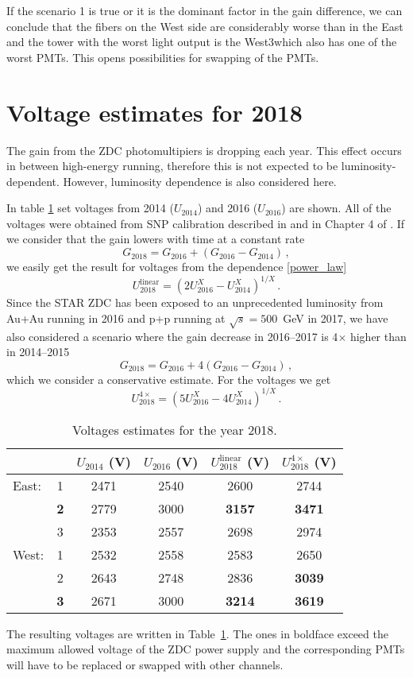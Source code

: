 If the scenario 1 is true or it is the dominant factor in the gain difference, we can conclude that the fibers on the West side are considerably worse than in the East and the tower with the worst light output is the West3\@ which also has one of the worst PMTs. This opens possibilities for swapping of the PMTs.

\section{Voltage estimates for 2018}
The gain from the ZDC photomultipiers is dropping each year. This effect occurs in between high-energy running, therefore this is not expected to be luminosity-dependent. However, luminosity dependence is also considered here.

In table \ref{voltsTable} set voltages from 2014 ($U_{2014}$) and 2016 ($U_{2016}$) are shown. All of the voltages were obtained from SNP calibration described in \cite{calib2014} and in Chapter 4 of \cite{ZDC_ops_manual}\@. If we consider that the gain lowers with time at a constant rate
\begin{equation}
G_{2018} = G_{2016} + (G_{2016} - G_{2014})\,,
\end{equation}
we easily get the result for voltages from the dependence \eqref{power_law}
\begin{equation}
U_{2018}^\text{linear} = (2 U_{2016}^X - U_{2014}^X)^{1/X}\,.
\end{equation}
Since the STAR ZDC has been exposed to an unprecedented luminosity from Au+Au running in 2016 and p+p running at $\sqrt{s} = 500$~GeV in 2017, we have also considered a scenario where the gain decrease in 2016--2017 is 4$\times$ higher than in 2014--2015
\begin{equation}
G_{2018} = G_{2016} + 4(G_{2016} - G_{2014})\,,
\end{equation}
which we consider a conservative estimate. For the voltages we get
\begin{equation}
U_{2018}^{4\times} = (5 U_{2016}^X - 4 U_{2014}^X)^{1/X}\,.
\end{equation}

\begin{table}[htb]
\caption{\label{voltsTable}Voltages estimates for the year 2018.}
\begin{center}
\begin{tabular}{lccccc}
\toprule
&&$U_{2014}$ (V)&$U_{2016}$ (V)& $U_{2018}^\text{linear}$ (V)&$U_{2018}^{4\times}$ (V)\\
\midrule
East:&1&2471&2540&2600&2744\\
&\textbf{2}&2779&3000&\textbf{3157}&\textbf{3471}\\
&3&2353&2557&2698&2974\\
\midrule
West:&1&2532&2558&2583&2650\\
&2&2643&2748&2836&\textbf{3039}\\
&\textbf{3}&2671&3000&\textbf{3214}&\textbf{3619}\\
\bottomrule
\end{tabular}
\end{center}
\end{table}

The resulting voltages are written in Table~\ref{voltsTable}. The ones in boldface exceed the maximum allowed voltage of the ZDC power supply and the corresponding PMTs will have to be replaced or swapped with other channels.
